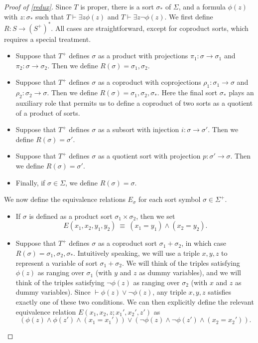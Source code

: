 \begin{proof}[Proof of \ref{redux}] Since $T$ is proper, there is a
  sort $\sigma _\ast$ of $\Sigma$, and a formula $\phi (z)$ with
  $z:\sigma _\ast$ such that $T\vdash\exists z\phi (z)$ and
  $T\vdash\exists z\neg\phi (z)$.  We first define $R:S\to (S^+)^*$.
  All cases are straightforward, except for coproduct sorts, which
  requires a special treatment.
  \begin{itemize}
  \item Suppose that $T^+$ defines $\sigma$ as a product with
    projections $\pi _1:\sigma\to\sigma _1$ and
    $\pi _2:\sigma\to\sigma _2$.  Then we define
    $R(\sigma )=\sigma _1,\sigma _2$.
  \item Suppose that $T^+$ defines $\sigma$ as a coproduct with
    coprojections $\rho _1:\sigma _1\to \sigma$ and
    $\rho _2:\sigma _2\to \sigma$.  Then we define
    $R(\sigma )=\sigma _1,\sigma _2,\sigma _\ast$.  Here the final
    sort $\sigma _\ast$ plays an auxiliary role that permits us to
    define a coproduct of two sorts as a quotient of a product of
    sorts.
  \item Suppose that $T^+$ defines $\sigma$ as a subsort with
    injection $i:\sigma\to\sigma '$.  Then we define
    $R(\sigma )=\sigma '$.
  \item Suppose that $T^+$ defines $\sigma$ as a quotient sort with
    projection $p:\sigma '\to\sigma$.  Then we define
    $R(\sigma )=\sigma '$.
  \item Finally, if $\sigma\in\Sigma$, we define $R(\sigma )=\sigma$.
  \end{itemize}

  \noindent We now define the equivalence relations $E_\sigma$ for
  each sort symbol $\sigma\in\Sigma ^+$.
\begin{itemize}
\item If $\sigma$ is defined as a product sort
  $\sigma _1\times \sigma _2$, then we set
  \[ E(x_1,x_2,y_1,y_2) \: \equiv \: (x_1=y_1)\wedge (x_2=y_2) . \]
\item Suppose that $T^+$ defines $\sigma$ as a coproduct sort
  $\sigma _1+\sigma _2$, in which case
  $R(\sigma )=\sigma _1,\sigma _2,\sigma _\ast$.  Intuitively
  speaking, we will use a triple $x,y,z$ to represent a variable of
  sort $\sigma _1+\sigma _2$.  We will think of the triples satisfying
  $\phi (z)$ as ranging over $\sigma _1$ (with $y$ and $z$ as dummy
  variables), and we will think of the triples satisfying
  $\neg \phi (z)$ as ranging over $\sigma _2$ (with $x$ and $z$ as
  dummy variables).  Since $\vdash \phi (z)\vee \neg \phi (z)$, any
  triple $x,y,z$ satisfies exactly one of these two conditions.  We
  can then explicitly define the relevant equivalence relation
  $E(x_1,x_2,z;x_1',x_2',z')$ as
  \[ (\phi (z)\wedge \phi (z')\wedge (x_1=x_1'))\vee (\neg\phi
    (z)\wedge \neg \phi (z')\wedge (x_2=x_2')) . \] 


\end{itemize}
\end{proof}
